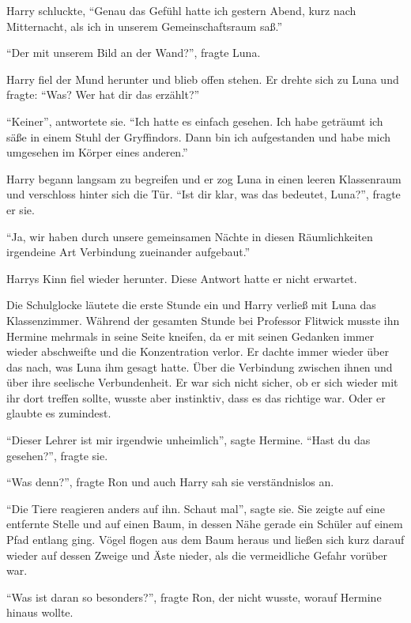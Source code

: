 Harry schluckte, \enquote{Genau das Gefühl hatte ich gestern Abend, kurz nach Mitternacht, als ich in unserem Gemeinschaftsraum saß.}

\enquote{Der mit unserem Bild an der Wand?}, fragte Luna.

Harry fiel der Mund herunter und blieb offen stehen. Er drehte sich zu Luna und fragte: \enquote{Was? Wer hat dir das erzählt?}

\enquote{Keiner}, antwortete sie. \enquote{Ich hatte es einfach gesehen. Ich habe geträumt ich säße in einem Stuhl der Gryffindors. Dann bin ich aufgestanden und habe mich umgesehen \gst im Körper eines anderen.}

Harry begann langsam zu begreifen und er zog Luna in einen leeren Klassenraum und verschloss hinter sich die Tür. \enquote{Ist dir klar, was das bedeutet, Luna?}, fragte er sie.

\enquote{Ja, wir haben durch unsere gemeinsamen Nächte in diesen Räumlichkeiten irgendeine Art Verbindung zueinander aufgebaut.}

Harrys Kinn fiel wieder herunter. Diese Antwort hatte er nicht erwartet.

Die Schulglocke läutete die erste Stunde ein und Harry verließ mit Luna das Klassenzimmer. Während der gesamten Stunde bei Professor Flitwick musste ihn Hermine mehrmals in seine Seite kneifen, da er mit seinen Gedanken immer wieder abschweifte und die Konzentration verlor. Er dachte immer wieder über das nach, was Luna ihm gesagt hatte. Über die Verbindung zwischen ihnen und über ihre seelische Verbundenheit. Er war sich nicht sicher, ob er sich wieder mit ihr dort treffen sollte, wusste aber instinktiv, dass es das richtige war. Oder er glaubte es zumindest.

\trenn

\enquote{Dieser Lehrer ist mir irgendwie unheimlich}, sagte Hermine. \enquote{Hast du das gesehen?}, fragte sie.

\enquote{Was denn?}, fragte Ron und auch Harry sah sie verständnislos an.

\enquote{Die Tiere reagieren anders auf ihn. Schaut mal}, sagte sie. Sie zeigte auf eine entfernte Stelle und auf einen Baum, in dessen Nähe gerade ein Schüler auf einem Pfad entlang ging. Vögel flogen aus dem Baum heraus und ließen sich kurz darauf wieder auf dessen Zweige und Äste nieder, als die vermeidliche Gefahr vorüber war.

\enquote{Was ist daran so besonders?}, fragte Ron, der nicht wusste, worauf Hermine hinaus wollte.

